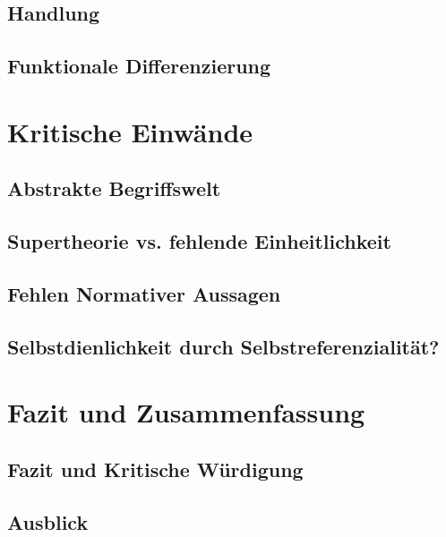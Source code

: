 \documentclass[a4paper,12pt]{article}
\begin{document}
\subsection{Handlung}
\subsection{Funktionale Differenzierung}

\section{Kritische Einwände}
\subsection{Abstrakte Begriffswelt}
\subsection{Supertheorie vs. fehlende Einheitlichkeit}
\subsection{Fehlen Normativer Aussagen}
\subsection{Selbstdienlichkeit durch Selbstreferenzialität?}

\section{Fazit und Zusammenfassung}
\subsection{Fazit und Kritische Würdigung}
\subsection{Ausblick}


\newpage

\nocite{*}
\printbibliography
% 
%
\end{document}

